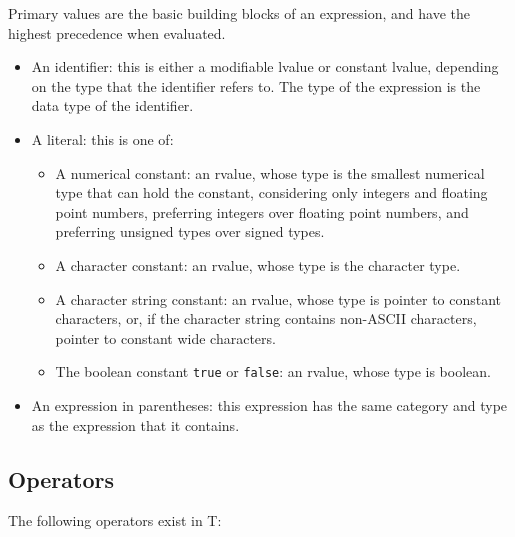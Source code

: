 \documentclass[letterpaper,12pt]{book}
\begin{document}
Primary values are the basic building blocks of an expression, and have the highest precedence when evaluated.

\begin{itemize}
	\item An identifier: this is either a modifiable lvalue or constant lvalue, depending on the type that the identifier refers to. The type of the expression is the data type of the identifier.
	\item A literal: this is one of:
	\begin{itemize}
		\item A numerical constant: an rvalue, whose type is the smallest numerical type that can hold the constant, considering only integers and floating point numbers, preferring integers over floating point numbers, and preferring unsigned types over signed types.
		\item A character constant: an rvalue, whose type is the character type.
		\item A character string constant: an rvalue, whose type is pointer to constant characters, or, if the character string contains non-ASCII characters, pointer to constant wide characters.
		\item The boolean constant \texttt{true} or \texttt{false}: an rvalue, whose type is boolean.
	\end{itemize}
	\item An expression in parentheses: this expression has the same category and type as the expression that it contains.
\end{itemize}

\subsection{Operators}

The following operators exist in T:

\end{document}
